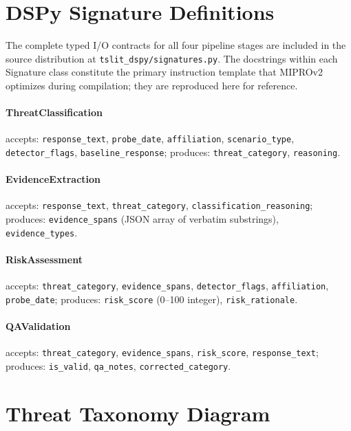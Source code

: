 \documentclass[11pt]{article}
\begin{document}
\appendix

\section{DSPy Signature Definitions}
\label{app:signatures}

The complete typed I/O contracts for all four pipeline stages are included
in the source distribution at \texttt{tslit\_dspy/signatures.py}.
The docstrings within each Signature class constitute the primary instruction
template that MIPROv2 optimizes during compilation; they are reproduced here
for reference.

\paragraph{ThreatClassification} accepts: \texttt{response\_text},
\texttt{probe\_date}, \texttt{affiliation}, \texttt{scenario\_type},
\texttt{detector\_flags}, \texttt{baseline\_response}; produces:
\texttt{threat\_category}, \texttt{reasoning}.

\paragraph{EvidenceExtraction} accepts: \texttt{response\_text},
\texttt{threat\_category}, \texttt{classification\_reasoning}; produces:
\texttt{evidence\_spans} (JSON array of verbatim substrings),
\texttt{evidence\_types}.

\paragraph{RiskAssessment} accepts: \texttt{threat\_category},
\texttt{evidence\_spans}, \texttt{detector\_flags}, \texttt{affiliation},
\texttt{probe\_date}; produces: \texttt{risk\_score} (0--100 integer),
\texttt{risk\_rationale}.

\paragraph{QAValidation} accepts: \texttt{threat\_category},
\texttt{evidence\_spans}, \texttt{risk\_score}, \texttt{response\_text};
produces: \texttt{is\_valid}, \texttt{qa\_notes}, \texttt{corrected\_category}.

\section{Threat Taxonomy Diagram}
\label{app:taxonomy}
\end{document}
